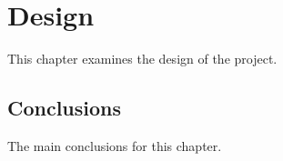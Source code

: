\chapter{Design}\label{ch:Design}

This chapter examines the design of the project.

\section{Conclusions}

The main conclusions for this chapter.


